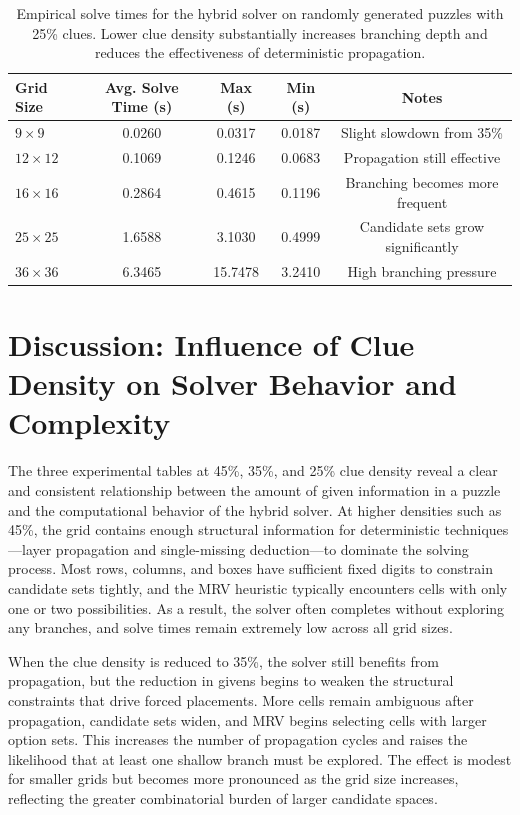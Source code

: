 \documentclass[11pt]{article}
\begin{document}
\begin{table}[h]
\centering
\begin{tabular}{@{}lcccc@{}}
\toprule
Grid Size & Avg. Solve Time (s) & Max (s) & Min (s) & Notes \\
\midrule
$9 \times 9$   & 0.0260 & 0.0317 & 0.0187 & Slight slowdown from 35\% \\
$12 \times 12$ & 0.1069 & 0.1246 & 0.0683 & Propagation still effective \\
$16 \times 16$ & 0.2864 & 0.4615 & 0.1196 & Branching becomes more frequent \\
$25 \times 25$ & 1.6588 & 3.1030 & 0.4999 & Candidate sets grow significantly \\
$36 \times 36$ & 6.3465 & 15.7478 & 3.2410 & High branching pressure \\
\bottomrule
\end{tabular}
\caption{Empirical solve times for the hybrid solver on randomly generated puzzles
with 25\% clues. Lower clue density substantially increases branching depth and
reduces the effectiveness of deterministic propagation.}
\label{tab:times25}
\end{table}
\section{Discussion: Influence of Clue Density on Solver Behavior and Complexity}

The three experimental tables at 45\%, 35\%, and 25\% clue density reveal a clear and consistent relationship between the amount of given information in a puzzle and the computational behavior of the hybrid solver. At higher densities such as 45\%, the grid contains enough structural information for deterministic techniques—layer propagation and single-missing deduction—to dominate the solving process. Most rows, columns, and boxes have sufficient fixed digits to constrain candidate sets tightly, and the MRV heuristic typically encounters cells with only one or two possibilities. As a result, the solver often completes without exploring any branches, and solve times remain extremely low across all grid sizes.

When the clue density is reduced to 35\%, the solver still benefits from propagation, but the reduction in givens begins to weaken the structural constraints that drive forced placements. More cells remain ambiguous after propagation, candidate sets widen, and MRV begins selecting cells with larger option sets. This increases the number of propagation cycles and raises the likelihood that at least one shallow branch must be explored. The effect is modest for smaller grids but becomes more pronounced as the grid size increases, reflecting the greater combinatorial burden of larger candidate spaces.
\end{document}
